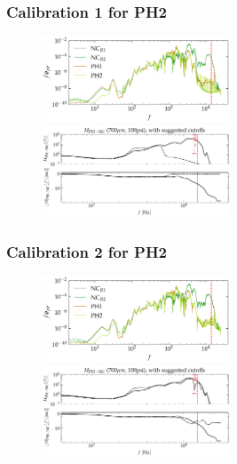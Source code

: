 \documentclass[aspectratio=169,9pt]{beamer}
\begin{document}
\begin{frame}
  \frametitle{Calibration 1 for PH2}
  \begin{figure}
    \centering
    \includegraphics[width=0.5\textwidth]{tf_calib/700_100psi_calib_spec.png}
    \includegraphics[width=0.5\textwidth]{tf_calib/700_100psi_H.pdf}
  \end{figure}
\end{frame}

\begin{frame}
  \frametitle{Calibration 2 for PH2}
  \begin{figure}
    \centering
    \includegraphics[width=0.5\textwidth]{tf_calib/700_100psi_calib_spec_a2.png}
    \includegraphics[width=0.5\textwidth]{tf_calib/700_100psi_H_a2.pdf}
  \end{figure}
\end{frame}

\end{document}
